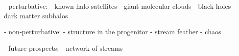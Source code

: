 \documentclass[12pt, modern]{aastex62}
\newcommand{\acronym}[1]{{\small{#1}}}
\newcommand{\lcdm}{\acronym{$\Lambda$CDM}}
\newcommand{\msun}{\textrm{M}_\odot}
\begin{document}
- perturbative:
- known halo satellites
- giant molecular clouds
- black holes
- dark matter subhalos

- non-perturbative:
- structure in the progenitor
- stream feather
- chaos

- future prospects:
- network of streams


% 
% 
% 
% 
% 
% 
% 
% 
\end{document}

